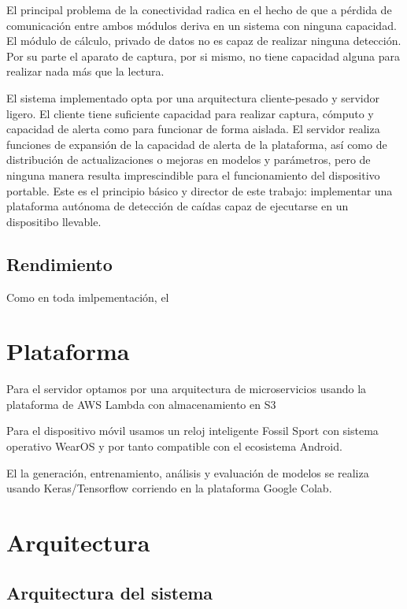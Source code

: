 \documentclass[../tfm.tex]{subfiles}
\begin{document}
El principal problema de la conectividad radica en el hecho de que a pérdida de comunicación entre ambos módulos deriva en un sistema con ninguna capacidad. El módulo de cálculo, privado de datos no es capaz de realizar ninguna detección. Por su parte el aparato de captura, por si mismo, no tiene capacidad alguna para realizar nada más que la lectura.

El sistema implementado opta por una arquitectura cliente-pesado y servidor ligero. El cliente tiene suficiente capacidad para realizar captura, cómputo y capacidad de alerta como para funcionar de forma aislada. El servidor realiza funciones de expansión de la capacidad de alerta de la plataforma, así como de distribución de actualizaciones o mejoras en modelos y parámetros, pero de ninguna manera resulta imprescindible para el funcionamiento del dispositivo portable. Este es el principio básico y director de este trabajo: implementar una plataforma autónoma de detección de caídas capaz de ejecutarse en un dispositibo llevable.

\subsection{Rendimiento}

Como en toda imlpementación, el

\section{Plataforma}

Para el servidor optamos por una arquitectura de microservicios usando la plataforma de AWS Lambda con almacenamiento en S3

Para el dispositivo móvil usamos un reloj inteligente Fossil Sport con sistema operativo WearOS y por tanto compatible con el ecosistema Android.

El la generación, entrenamiento, análisis y evaluación de modelos se realiza usando Keras/Tensorflow corriendo en la plataforma Google Colab.

\section{Arquitectura}\label{desc_archi}

\subsection{Arquitectura del sistema}
\end{document}
